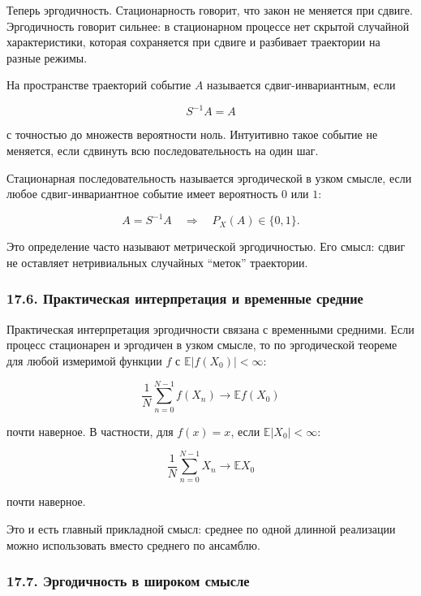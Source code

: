 \documentclass[
  11pt,
  a4paper,
]{article}
\begin{document}
Теперь эргодичность. Стационарность говорит, что закон не меняется при
сдвиге. Эргодичность говорит сильнее: в стационарном процессе нет
скрытой случайной характеристики, которая сохраняется при сдвиге и
разбивает траектории на разные режимы.

На пространстве траекторий событие \(A\) называется сдвиг-инвариантным,
если

\[
S^{-1}A=A
\]

с точностью до множеств вероятности ноль. Интуитивно такое событие не
меняется, если сдвинуть всю последовательность на один шаг.

Стационарная последовательность называется эргодической в узком смысле,
если любое сдвиг-инвариантное событие имеет вероятность \(0\) или \(1\):

\[
A=S^{-1}A
\quad\Longrightarrow\quad
P_X(A)\in\{0,1\}.
\]

Это определение часто называют метрической эргодичностью. Его смысл:
сдвиг не оставляет нетривиальных случайных ``меток'' траектории.

\subsubsection{17.6. Практическая интерпретация и временные
средние}\label{ux43fux440ux430ux43aux442ux438ux447ux435ux441ux43aux430ux44f-ux438ux43dux442ux435ux440ux43fux440ux435ux442ux430ux446ux438ux44f-ux438-ux432ux440ux435ux43cux435ux43dux43dux44bux435-ux441ux440ux435ux434ux43dux438ux435}

Практическая интерпретация эргодичности связана с временными средними.
Если процесс стационарен и эргодичен в узком смысле, то по эргодической
теореме для любой измеримой функции \(f\) с
\(\mathbb E|f(X_0)|<\infty\):

\[
\frac1N\sum_{n=0}^{N-1} f(X_n)
\to
\mathbb E f(X_0)
\]

почти наверное. В частности, для \(f(x)=x\), если
\(\mathbb E|X_0|<\infty\):

\[
\frac1N\sum_{n=0}^{N-1}X_n
\to
\mathbb E X_0
\]

почти наверное.

Это и есть главный прикладной смысл: среднее по одной длинной реализации
можно использовать вместо среднего по ансамблю.

\subsubsection{17.7. Эргодичность в широком
смысле}\label{ux44dux440ux433ux43eux434ux438ux447ux43dux43eux441ux442ux44c-ux432-ux448ux438ux440ux43eux43aux43eux43c-ux441ux43cux44bux441ux43bux435}
\end{document}
